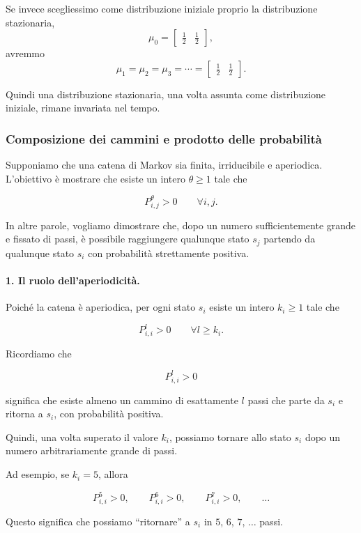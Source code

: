Se invece scegliessimo come distribuzione iniziale proprio la distribuzione
stazionaria,
\[
\mu_0=
\begin{bmatrix}
\frac12&\frac12
\end{bmatrix},
\]
avremmo
\[
\mu_1=\mu_2=\mu_3=\cdots=
\begin{bmatrix}
\frac12&\frac12
\end{bmatrix}.
\]

Quindi una distribuzione stazionaria, una volta assunta come distribuzione
iniziale, rimane invariata nel tempo.

\subsubsection{Composizione dei cammini e prodotto delle probabilità}

Supponiamo che una catena di Markov sia finita, irriducibile e aperiodica. L'obiettivo è mostrare che esiste un intero $\theta \geq 1$ tale che

$$
P^\theta_{i,j}>0
\qquad
\forall i,j.
$$

In altre parole, vogliamo dimostrare che, dopo un numero sufficientemente grande e fissato di passi, è possibile raggiungere qualunque stato $s_j$ partendo da qualunque stato $s_i$ con probabilità strettamente positiva.

\paragraph{1. Il ruolo dell'aperiodicità.}

Poiché la catena è aperiodica, per ogni stato $s_i$ esiste un intero $k_i\geq 1$ tale che

$$
P^l_{i,i}>0
\qquad
\forall l\geq k_i.
$$

Ricordiamo che

$$
P^l_{i,i}>0
$$

significa che esiste almeno un cammino di esattamente $l$ passi che parte da $s_i$ e ritorna a $s_i$, con probabilità positiva.

Quindi, una volta superato il valore $k_i$, possiamo tornare allo stato $s_i$ dopo un numero arbitrariamente grande di passi.

Ad esempio, se $k_i=5$, allora

$$
P^5_{i,i}>0,\qquad
P^6_{i,i}>0,\qquad
P^7_{i,i}>0,\qquad \ldots
$$

Questo significa che possiamo ``ritornare'' a $s_i$ in $5$, $6$, $7$, $\ldots$ passi.

